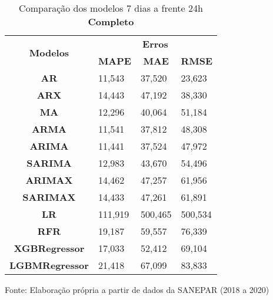 \begin{table}[H]
	\centering
	\caption{Comparação dos modelos 7 dias a frente 24h \textbf{Completo} }\label{tb:10-24cm}
	\begin{tabular}{@{}clll@{}}
		\toprule
		\multirow{2}{*}{\textbf{Modelos}} & \multicolumn{3}{c}{\textbf{Erros}}                                                                       \\ \cmidrule(l){2-4} 
		& \multicolumn{1}{c}{\textbf{MAPE}} & \multicolumn{1}{c}{\textbf{MAE}} & \multicolumn{1}{c}{\textbf{RMSE}} \\ \hline
\textbf{AR}                       & 11,543                            & 37,520                           & 23,623                            \\
\textbf{ARX}                      & 14,443                            & 47,192                           & 38,330                            \\
\textbf{MA}                       & 12,296                            & 40,064                           & 51,184                            \\
\textbf{ARMA}                     & 11,541                            & 37,812                           & 48,308                            \\
\textbf{ARIMA}                    & 11,441                            & 37,524                           & 47,972                            \\
\textbf{SARIMA}                   & 12,983                            & 43,670                           & 54,496                            \\
\textbf{ARIMAX}                   & 14,462                            & 47,257                           & 61,956                            \\
\textbf{SARIMAX}                  & 14,433                            & 47,261                           & 61,891                            \\
\textbf{LR}        & 111,919                           & 500,465                          & 500,534                           \\
\textbf{RFR}  & 19,187                            & 59,557                           & 76,339                            \\
\textbf{XGBRegressor}             & 17,033                            & 52,412                           & 69,104                            \\
\textbf{LGBMRegressor}            & 21,418                            & 67,099                           & 83,833                            \\ \bottomrule
	\end{tabular}

Fonte: Elaboração própria a partir de dados da SANEPAR (2018 a 2020)
\end{table}



